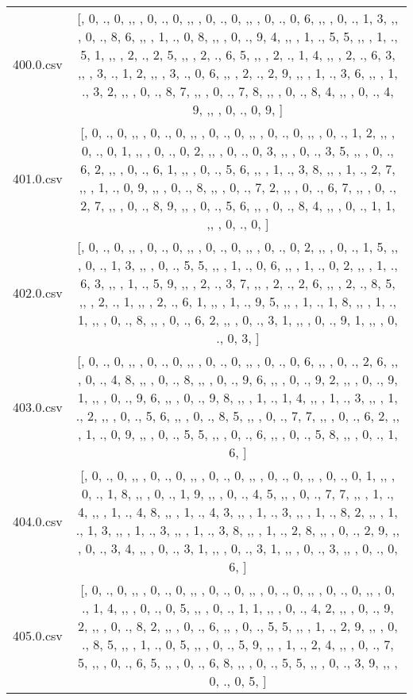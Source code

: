 \begin{table}[ht]
\begin{tabular}{@{}c c@{}}
	400.0.csv & [, 0, ., 0, ,,  , 0, ., 0, ,,  , 0, ., 0, ,,  , 0, ., 0, 6, ,,  , 0, ., 1, 3, ,,  , 0, ., 8, 6, ,,  , 1, ., 0, 8, ,,  , 0, ., 9, 4, ,,  , 1, ., 5, 5, ,,  , 1, ., 5, 1, ,,  , 2, ., 2, 5, ,,  , 2, ., 6, 5, ,,  , 2, ., 1, 4, ,,  , 2, ., 6, 3, ,,  , 3, ., 1, 2, ,,  , 3, ., 0, 6, ,,  , 2, ., 2, 9, ,,  , 1, ., 3, 6, ,,  , 1, ., 3, 2, ,,  , 0, ., 8, 7, ,,  , 0, ., 7, 8, ,,  , 0, ., 8, 4, ,,  , 0, ., 4, 9, ,,  , 0, ., 0, 9, ]\\ 
	401.0.csv & [, 0, ., 0, ,,  , 0, ., 0, ,,  , 0, ., 0, ,,  , 0, ., 0, ,,  , 0, ., 1, 2, ,,  , 0, ., 0, 1, ,,  , 0, ., 0, 2, ,,  , 0, ., 0, 3, ,,  , 0, ., 3, 5, ,,  , 0, ., 6, 2, ,,  , 0, ., 6, 1, ,,  , 0, ., 5, 6, ,,  , 1, ., 3, 8, ,,  , 1, ., 2, 7, ,,  , 1, ., 0, 9, ,,  , 0, ., 8, ,,  , 0, ., 7, 2, ,,  , 0, ., 6, 7, ,,  , 0, ., 2, 7, ,,  , 0, ., 8, 9, ,,  , 0, ., 5, 6, ,,  , 0, ., 8, 4, ,,  , 0, ., 1, 1, ,,  , 0, ., 0, ]\\ 
	402.0.csv & [, 0, ., 0, ,,  , 0, ., 0, ,,  , 0, ., 0, ,,  , 0, ., 0, 2, ,,  , 0, ., 1, 5, ,,  , 0, ., 1, 3, ,,  , 0, ., 5, 5, ,,  , 1, ., 0, 6, ,,  , 1, ., 0, 2, ,,  , 1, ., 6, 3, ,,  , 1, ., 5, 9, ,,  , 2, ., 3, 7, ,,  , 2, ., 2, 6, ,,  , 2, ., 8, 5, ,,  , 2, ., 1, ,,  , 2, ., 6, 1, ,,  , 1, ., 9, 5, ,,  , 1, ., 1, 8, ,,  , 1, ., 1, ,,  , 0, ., 8, ,,  , 0, ., 6, 2, ,,  , 0, ., 3, 1, ,,  , 0, ., 9, 1, ,,  , 0, ., 0, 3, ]\\ 
	403.0.csv & [, 0, ., 0, ,,  , 0, ., 0, ,,  , 0, ., 0, ,,  , 0, ., 0, 6, ,,  , 0, ., 2, 6, ,,  , 0, ., 4, 8, ,,  , 0, ., 8, ,,  , 0, ., 9, 6, ,,  , 0, ., 9, 2, ,,  , 0, ., 9, 1, ,,  , 0, ., 9, 6, ,,  , 0, ., 9, 8, ,,  , 1, ., 1, 4, ,,  , 1, ., 3, ,,  , 1, ., 2, ,,  , 0, ., 5, 6, ,,  , 0, ., 8, 5, ,,  , 0, ., 7, 7, ,,  , 0, ., 6, 2, ,,  , 1, ., 0, 9, ,,  , 0, ., 5, 5, ,,  , 0, ., 6, ,,  , 0, ., 5, 8, ,,  , 0, ., 1, 6, ]\\ 
	404.0.csv & [, 0, ., 0, ,,  , 0, ., 0, ,,  , 0, ., 0, ,,  , 0, ., 0, ,,  , 0, ., 0, 1, ,,  , 0, ., 1, 8, ,,  , 0, ., 1, 9, ,,  , 0, ., 4, 5, ,,  , 0, ., 7, 7, ,,  , 1, ., 4, ,,  , 1, ., 4, 8, ,,  , 1, ., 4, 3, ,,  , 1, ., 3, ,,  , 1, ., 8, 2, ,,  , 1, ., 1, 3, ,,  , 1, ., 3, ,,  , 1, ., 3, 8, ,,  , 1, ., 2, 8, ,,  , 0, ., 2, 9, ,,  , 0, ., 3, 4, ,,  , 0, ., 3, 1, ,,  , 0, ., 3, 1, ,,  , 0, ., 3, ,,  , 0, ., 0, 6, ]\\ 
	405.0.csv & [, 0, ., 0, ,,  , 0, ., 0, ,,  , 0, ., 0, ,,  , 0, ., 0, ,,  , 0, ., 0, ,,  , 0, ., 1, 4, ,,  , 0, ., 0, 5, ,,  , 0, ., 1, 1, ,,  , 0, ., 4, 2, ,,  , 0, ., 9, 2, ,,  , 0, ., 8, 2, ,,  , 0, ., 6, ,,  , 0, ., 5, 5, ,,  , 1, ., 2, 9, ,,  , 0, ., 8, 5, ,,  , 1, ., 0, 5, ,,  , 0, ., 5, 9, ,,  , 1, ., 2, 4, ,,  , 0, ., 7, 5, ,,  , 0, ., 6, 5, ,,  , 0, ., 6, 8, ,,  , 0, ., 5, 5, ,,  , 0, ., 3, 9, ,,  , 0, ., 0, 5, ]\\ 

\end{tabular}
\end{table}
